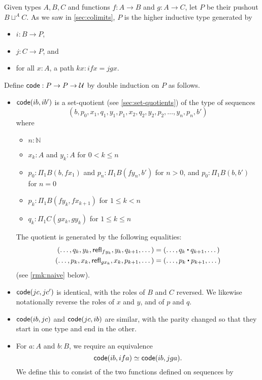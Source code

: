 Given types $A,B,C$ and functions $f:A\to B$ and $g:A\to C$, let $P$ be their pushout $B\sqcup^A C$.
As we saw in \autoref{sec:colimits}, $P$ is the higher inductive type generated by
\begin{itemize}
\item $i:B\to P$,
\item $j:C\to P$, and
\item for all $x:A$, a path $k x:ifx = jgx$.
\end{itemize}
Define $\mathsf{code}:P\to P\to \mathcal{U}$ by double induction on $P$ as follows.
\begin{itemize}
\item $\mathsf{code}(ib,ib')$ is a set-quotient (see \autoref{sec:set-quotients}) of the type of sequences %
  \[ (b, p_0, x_1, q_1, y_1, p_1, x_2, q_2, y_2, p_2, \dots, y_n, p_n, b') \]
  where
  \begin{itemize}
  \item $n:\mathbb{N}$
  \item $x_k:A$ and $y_k:A$ for $0<k \le n$
  \item $p_0:\Pi_1B(b,f x_1)$ and $p_n:\Pi_1B(f y_n, b')$ for $n>0$, and $p_0:\Pi_1B(b,b')$ for $n=0$
  \item $p_k:\Pi_1B(f y_k, fx_{k+1})$ for $1\le k < n$
  \item $q_k:\Pi_1C(gx_k, gy_k)$ for $1\le k\le n$
  \end{itemize}
  The quotient is generated by the following equalities:
  \begin{align*}
    (\dots, q_k, y_k, \refl{fy_k}, y_k, q_{k+1},\dots)
    &= (\dots, q_k\ct q_{k+1},\dots)\\
    (\dots, p_k, x_k, \refl{gx_k}, x_k, p_{k+1},\dots)
    &= (\dots, p_k\ct p_{k+1},\dots)
  \end{align*}
  (see \autoref{rmk:naive} below).
\item $\mathsf{code}(jc,jc')$ is identical, with the roles of $B$ and $C$ reversed.
  We likewise notationally reverse the roles of $x$ and $y$, and of $p$ and $q$.
\item $\mathsf{code}(ib,jc)$ and $\mathsf{code}(jc,ib)$ are similar, with the parity changed so that they start in one type and end in the other.
\item For $a:A$ and $b:B$, we require an equivalence
  \begin{equation}
    \code(ib, ifa) \eqvsym \code(ib,jga).\label{eq:bfa-bga}
  \end{equation}
  We define this to consist of the two functions defined on sequences by

\end{itemize}
